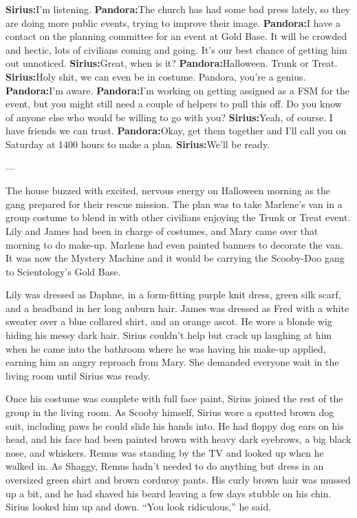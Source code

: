 \documentclass[12pt,twoside,openright]{memoir}
\begin{document}
\textbf{Sirius:}I'm listening.\newline
\textbf{Pandora:}The church has had some bad press lately, so they are doing more public events, trying to improve their image.\newline
\textbf{Pandora:}I have a contact on the planning committee for an event at Gold Base. It will be crowded and hectic, lots of civilians coming and going. It's our best chance of getting him out unnoticed.\newline
\textbf{Sirius:}Great, when is it?\newline
\textbf{Pandora:}Halloween. Trunk or Treat.\newline
\textbf{Sirius:}Holy shit, we can even be in costume. Pandora, you're a genius.\newline
\textbf{Pandora:}I'm aware.\newline
\textbf{Pandora:}I'm working on getting assigned as a FSM for the event, but you might still need a couple of helpers to pull this off. Do you know of anyone else who would be willing to go with you?\newline
\textbf{Sirius:}Yeah, of course. I have friends we can trust.\newline
\textbf{Pandora:}Okay, get them together and I'll call you on Saturday at 1400 hours to make a plan.\newline
\textbf{Sirius:}We'll be ready.

---

The house buzzed with excited, nervous energy on Halloween morning as the gang prepared for their rescue mission. The plan was to take Marlene's van in a group costume to blend in with other civilians enjoying the Trunk or Treat event. Lily and James had been in charge of costumes, and Mary came over that morning to do make-up. Marlene had even painted banners to decorate the van. It was now the Mystery Machine and it would be carrying the Scooby-Doo gang to Scientology's Gold Base. 

Lily was dressed as Daphne, in a form-fitting purple knit dress, green silk scarf, and a headband in her long auburn hair. James was dressed as Fred with a white sweater over a blue collared shirt, and an orange ascot. He wore a blonde wig hiding his messy dark hair. Sirius couldn't help but crack up laughing at him when he came into the bathroom where he was having his make-up applied, earning him an angry reproach from Mary. She demanded everyone wait in the living room until Sirius was ready. 

Once his costume was complete with full face paint, Sirius joined the rest of the group in the living room. As Scooby himself, Sirius wore a spotted brown dog suit, including paws he could slide his hands into. He had floppy dog ears on his head, and his face had been painted brown with heavy dark eyebrows, a big black nose, and whiskers. Remus was standing by the TV and looked up when he walked in. As Shaggy, Remus hadn't needed to do anything but dress in an oversized green shirt and brown corduroy pants. His curly brown hair was mussed up a bit, and he had shaved his beard leaving a few days stubble on his chin. Sirius looked him up and down. ``You look ridiculous,'' he said.
\end{document}
